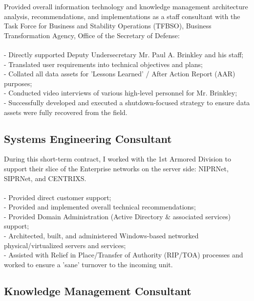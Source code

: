 \documentclass{article}
\begin{document}
{\noindent}Provided overall information technology and knowledge management architecture analysis, recommendations, and implementations as a staff consultant with the Task Force for Business and Stability Operations (TFBSO), Business Transformation Agency, Office of the Secretary of Defense:\\\\- Directly supported Deputy Undersecretary Mr. Paul A. Brinkley and his staff;\\- Translated user requirements into technical objectives and plans;\\- Collated all data assets for 'Lessons Learned' / After Action Report (AAR) purposes;\\- Conducted video interviews of various high-level personnel for Mr. Brinkley; \\- Successfully developed and executed a shutdown-focused strategy to ensure data assets were fully recovered from the ﬁeld.
\\\subsection { Systems Engineering Consultant }

{\noindent}During this short-term contract, I worked with the 1st Armored Division to support their slice of the Enterprise networks on the server side: NIPRNet, SIPRNet, and CENTRIXS.\\\\- Provided direct customer support;\\- Provided and implemented overall technical recommendations;\\- Provided Domain Administration (Active Directory \& associated services) support;\\- Architected, built, and administered Windows-based networked physical/virtualized servers and services;\\- Assisted with Relief in Place/Transfer of Authority (RIP/TOA) processes and worked to ensure a 'sane' turnover to the incoming unit.
\\\subsection { Knowledge Management Consultant }
\end{document}
